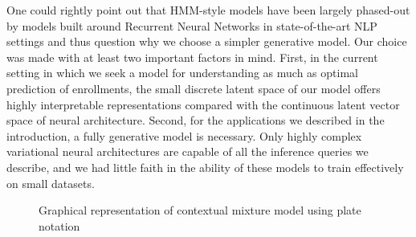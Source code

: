 \documentclass{edm_template}
\begin{document}
One could rightly point out that HMM-style models have been largely phased-out by models built around Recurrent Neural Networks in state-of-the-art NLP settings and thus question why we choose a simpler generative model. Our choice was made with at least two important factors in mind. First, in the current setting in which we seek a model for understanding as much as optimal prediction of enrollments, the small discrete latent space of our model offers highly interpretable representations compared with the continuous latent vector space of neural architecture. Second, for the applications we described in the introduction, a fully generative model is necessary. Only highly complex variational neural architectures are capable of all the inference queries we describe, and we had little faith in the ability of these models to train effectively on small datasets. 

\begin{figure}
    \centering
	
	\caption{\label{fig:contextual_mixture_model} Graphical representation of contextual mixture model using plate notation}
\end{figure}
\end{document}
